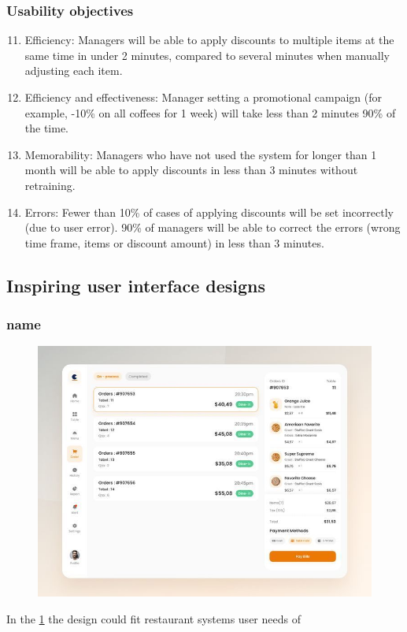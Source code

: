\documentclass{article}
\begin{document}
\subsubsection{Usability objectives}
\begin{enumerate}[label=S\arabic*.]
\setcounter{enumi}{10}
    \item Efficiency: Managers will be able to apply discounts to multiple items at the same time in under 2 minutes, compared to several minutes when manually adjusting each item.
    \item Efficiency and effectiveness: Manager setting a promotional campaign (for example, -10\% on all coffees for 1 week) will take less than 2 minutes 90\% of the time.
    \item Memorability: Managers who have not used the system for longer than 1 month will be able to apply discounts in less than 3 minutes without retraining.
    \item Errors: Fewer than 10\% of cases of applying discounts will be set incorrectly (due to user error). 90\% of managers will be able to correct the errors (wrong time frame, items or discount amount) in less than 3 minutes.
\end{enumerate}


\subsection{Inspiring user interface designs}
\subsubsection{name}
\begin{figure}[H]
    \centering
    \includegraphics[width=0.9\linewidth]{HCI/images/restaurant_UI_1.jpg}
    \caption{}
    \label{fig:restUI1}
\end{figure}
\noindent
In the \cref{fig:restUI1} the design could fit restaurant systems user needs of
\end{document}
